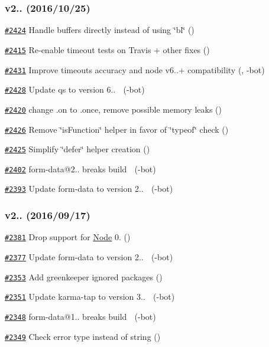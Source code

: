 \subsubsection*{v2.. (2016/10/25)}


\begin{DoxyItemize}
\item \href{https://github.com/request/request/pull/2424}{\tt \#2424} Handle buffers directly instead of using \char`\"{}bl\char`\"{} ()
\item \href{https://github.com/request/request/pull/2415}{\tt \#2415} Re-\/enable timeout tests on Travis + other fixes ()
\item \href{https://github.com/request/request/pull/2431}{\tt \#2431} Improve timeouts accuracy and node v6..+ compatibility (, -\/bot)
\item \href{https://github.com/request/request/pull/2428}{\tt \#2428} Update qs to version 6.. 🚀 (-\/bot)
\item \href{https://github.com/request/request/pull/2420}{\tt \#2420} change .on to .once, remove possible memory leaks ()
\item \href{https://github.com/request/request/pull/2426}{\tt \#2426} Remove \char`\"{}is\+Function\char`\"{} helper in favor of \char`\"{}typeof\char`\"{} check ()
\item \href{https://github.com/request/request/pull/2425}{\tt \#2425} Simplify \char`\"{}defer\char`\"{} helper creation ()
\item \href{https://github.com/request/request/pull/2402}{\tt \#2402} form-\/data@2.. breaks build 🚨 (-\/bot)
\item \href{https://github.com/request/request/pull/2393}{\tt \#2393} Update form-\/data to version 2.. 🚀 (-\/bot)
\end{DoxyItemize}

\subsubsection*{v2.. (2016/09/17)}


\begin{DoxyItemize}
\item \href{https://github.com/request/request/pull/2381}{\tt \#2381} Drop support for \mbox{\hyperlink{classNode}{Node}} 0. ()
\item \href{https://github.com/request/request/pull/2377}{\tt \#2377} Update form-\/data to version 2.. 🚀 (-\/bot)
\item \href{https://github.com/request/request/pull/2353}{\tt \#2353} Add greenkeeper ignored packages ()
\item \href{https://github.com/request/request/pull/2351}{\tt \#2351} Update karma-\/tap to version 3.. 🚀 (-\/bot)
\item \href{https://github.com/request/request/pull/2348}{\tt \#2348} form-\/data@1.. breaks build 🚨 (-\/bot)
\item \href{https://github.com/request/request/pull/2349}{\tt \#2349} Check error type instead of string ()
\end{DoxyItemize}

